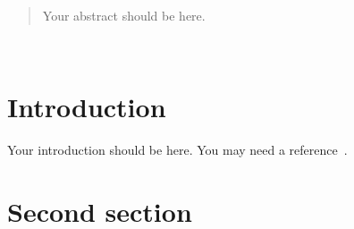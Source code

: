 \documentclass[11pt,a4paper,onecolumn,oneside]{report}
\begin{document}
%

%

\begin{abstract}
Your abstract should be here. \vfill
\end{abstract}

\clearpage

\hbox{ }
\thispagestyle{empty}
\clearpage

\tableofcontents{}
\thispagestyle{empty}
\vfill
\clearpage

{%
\let\oldnumberline\numberline%
\renewcommand{\numberline}{\figurename~\oldnumberline}%
\listoffigures%
}
\thispagestyle{empty}
\clearpage

{%
\let\oldnumberline\numberline%
\renewcommand{\numberline}{\tablename~\oldnumberline}%
\listoftables%
}
\thispagestyle{empty}
\clearpage

\setcounter{page}{1}



\section{Introduction} 

Your introduction should be here. You may need a reference~\cite{ref_sample}.


\newpage 
\section{Second section} 
\end{document}
